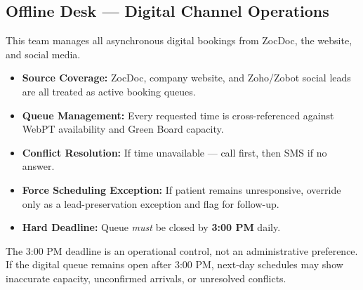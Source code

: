 \documentclass[11pt,a4paper]{article}
\begin{document}
\subsection{Offline Desk --- Digital Channel Operations}

This team manages all asynchronous digital bookings from ZocDoc, the website, and social media.

\begin{tcolorbox}[infobox,title={Offline Desk Key Rules}]
\begin{itemize}
  \item \textbf{Source Coverage:} ZocDoc, company website, and Zoho/Zobot social leads are all treated as active booking queues.
  \item \textbf{Queue Management:} Every requested time is cross-referenced against WebPT availability and Green Board capacity.
  \item \textbf{Conflict Resolution:} If time unavailable --- call first, then SMS if no answer.
  \item \textbf{Force Scheduling Exception:} If patient remains unresponsive, override only as a lead-preservation exception and flag for follow-up.
  \item \textbf{Hard Deadline:} Queue \emph{must} be closed by \textbf{3:00 PM} daily.
\end{itemize}
\end{tcolorbox}

\begin{tcolorbox}[warnbox,title={Offline Desk 3:00 PM Closure Rule}]
The 3:00 PM deadline is an operational control, not an administrative preference.
If the digital queue remains open after 3:00 PM, next-day schedules may show inaccurate capacity,
unconfirmed arrivals, or unresolved conflicts.
\end{tcolorbox}
\end{document}
